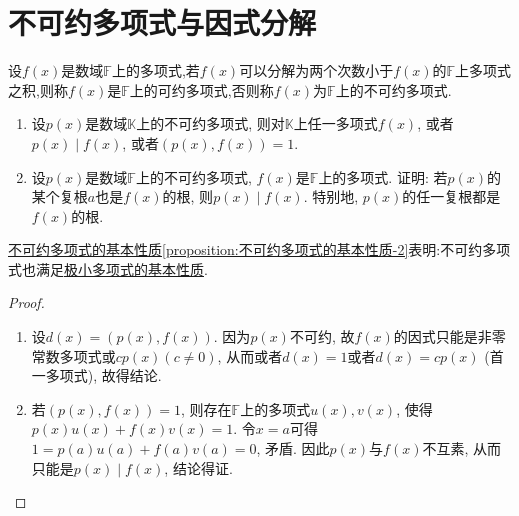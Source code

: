 \documentclass[../../main.tex]{subfiles}%
\begin{document}
\section{不可约多项式与因式分解}

\begin{definition}[不可约多项式的定义]\label{definition:不可约多项式的定义}
设\(f(x)\)是数域\(\mathbb{F}\)上的多项式,若\(f(x)\)可以分解为两个次数小于\(f(x)\)的\(\mathbb{F}\)上多项式之积,则称\(f(x)\)是\(\mathbb{F}\)上的可约多项式,否则称\(f(x)\)为\(\mathbb{F}\)上的不可约多项式.
\end{definition}

\begin{proposition}[不可约多项式的基本性质]\label{proposition:不可约多项式的基本性质}
\begin{enumerate}[(1)]
\item\label{proposition:不可约多项式的基本性质-1} 设\(p(x)\)是数域\(\mathbb{K}\)上的不可约多项式, 则对\(\mathbb{K}\)上任一多项式\(f(x)\), 或者\(p(x)\mid f(x)\), 或者\((p(x),f(x)) = 1\).

\item\label{proposition:不可约多项式的基本性质-2} 设\(p(x)\)是数域\(\mathbb{F}\)上的不可约多项式, \(f(x)\)是\(\mathbb{F}\)上的多项式. 证明: 若\(p(x)\)的某个复根\(a\)也是\(f(x)\)的根, 则\(p(x)\mid f(x)\). 特别地, \(p(x)\)的任一复根都是\(f(x)\)的根.
\end{enumerate}
\end{proposition}
\begin{note}
\hyperref[proposition:不可约多项式的基本性质]{不可约多项式的基本性质\cref{proposition:不可约多项式的基本性质-2}}表明:不可约多项式也满足\hyperref[proposition:极小多项式的基本性质]{极小多项式的基本性质}.
\end{note}
\begin{proof}
\begin{enumerate}[(1)]
\item 设\(d(x)=(p(x),f(x))\). 因为\(p(x)\)不可约, 故\(f(x)\)的因式只能是非零常数多项式或\(cp(x)(c\neq 0)\), 从而或者\(d(x)=1\)或者\(d(x)=cp(x)\) (首一多项式), 故得结论.

\item 若\((p(x),f(x)) = 1\), 则存在\(\mathbb{F}\)上的多项式\(u(x),v(x)\), 使得\(p(x)u(x)+f(x)v(x)=1\). 令\(x = a\)可得\(1 = p(a)u(a)+f(a)v(a)=0\), 矛盾. 因此\(p(x)\)与\(f(x)\)不互素, 从而只能是\(p(x)\mid f(x)\), 结论得证. 
\end{enumerate}
\end{proof}
\end{document}
